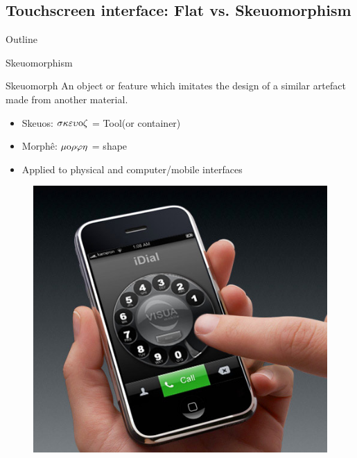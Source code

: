 \documentclass{beamer}
\begin{document}
\subsection{Touchscreen interface: Flat vs. Skeuomorphism}

\begin{frame}{Outline}
\end{frame}

\begin{frame}{Skeuomorphism}
\begin{block}{Skeuomorph}
An object or feature which imitates the design of a similar artefact made from another material.
\end{block}
\begin{itemize}
\item Skeuos: $\sigma \kappa \varepsilon \upsilon {\rm o} \zeta$ = Tool(or container)
\item Morphê: $\mu {\rm o} \rho \varphi \eta$ = shape
\item Applied to physical and computer/mobile interfaces
\end{itemize}
    \begin{figure}
\includegraphics[scale=0.25]{idial.jpg}
\end{figure}


\end{frame}
\end{document}
